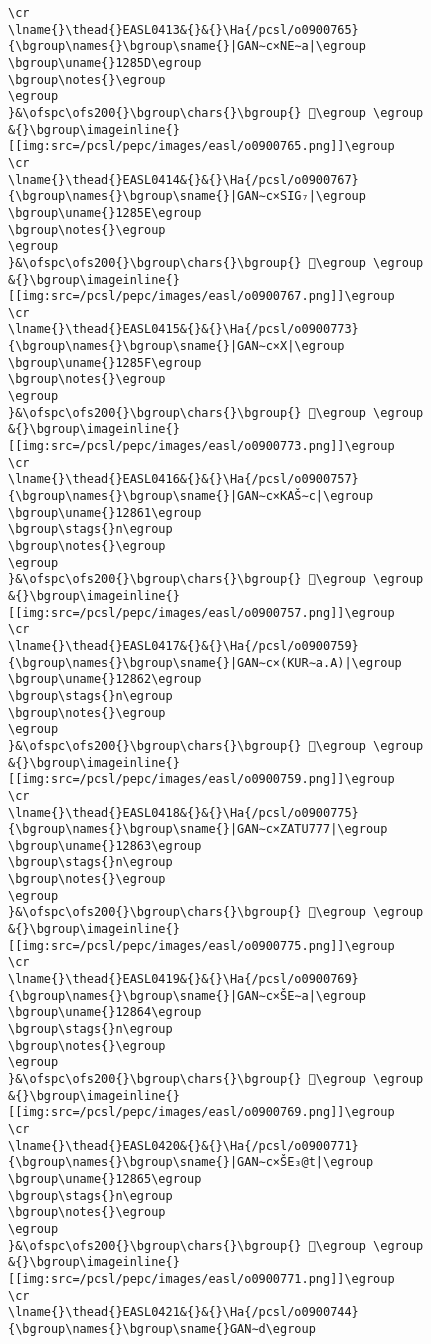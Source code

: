 \begin{verbatim}
\cr
\lname{}\thead{}EASL0413&{}&{}\Ha{/pcsl/o0900765}{\bgroup\names{}\bgroup\sname{}|GAN∼c×NE∼a|\egroup
\bgroup\uname{}1285D\egroup
\bgroup\notes{}\egroup
\egroup
}&\ofspc\ofs200{}\bgroup\chars{}\bgroup{} 𒡝\egroup \egroup
&{}\bgroup\imageinline{}[[img:src=/pcsl/pepc/images/easl/o0900765.png]]\egroup
\cr
\lname{}\thead{}EASL0414&{}&{}\Ha{/pcsl/o0900767}{\bgroup\names{}\bgroup\sname{}|GAN∼c×SIG₇|\egroup
\bgroup\uname{}1285E\egroup
\bgroup\notes{}\egroup
\egroup
}&\ofspc\ofs200{}\bgroup\chars{}\bgroup{} 𒡞\egroup \egroup
&{}\bgroup\imageinline{}[[img:src=/pcsl/pepc/images/easl/o0900767.png]]\egroup
\cr
\lname{}\thead{}EASL0415&{}&{}\Ha{/pcsl/o0900773}{\bgroup\names{}\bgroup\sname{}|GAN∼c×X|\egroup
\bgroup\uname{}1285F\egroup
\bgroup\notes{}\egroup
\egroup
}&\ofspc\ofs200{}\bgroup\chars{}\bgroup{} 𒡟\egroup \egroup
&{}\bgroup\imageinline{}[[img:src=/pcsl/pepc/images/easl/o0900773.png]]\egroup
\cr
\lname{}\thead{}EASL0416&{}&{}\Ha{/pcsl/o0900757}{\bgroup\names{}\bgroup\sname{}|GAN∼c×KAŠ∼c|\egroup
\bgroup\uname{}12861\egroup
\bgroup\stags{}n\egroup
\bgroup\notes{}\egroup
\egroup
}&\ofspc\ofs200{}\bgroup\chars{}\bgroup{} 𒡡\egroup \egroup
&{}\bgroup\imageinline{}[[img:src=/pcsl/pepc/images/easl/o0900757.png]]\egroup
\cr
\lname{}\thead{}EASL0417&{}&{}\Ha{/pcsl/o0900759}{\bgroup\names{}\bgroup\sname{}|GAN∼c×(KUR∼a.A)|\egroup
\bgroup\uname{}12862\egroup
\bgroup\stags{}n\egroup
\bgroup\notes{}\egroup
\egroup
}&\ofspc\ofs200{}\bgroup\chars{}\bgroup{} 𒡢\egroup \egroup
&{}\bgroup\imageinline{}[[img:src=/pcsl/pepc/images/easl/o0900759.png]]\egroup
\cr
\lname{}\thead{}EASL0418&{}&{}\Ha{/pcsl/o0900775}{\bgroup\names{}\bgroup\sname{}|GAN∼c×ZATU777|\egroup
\bgroup\uname{}12863\egroup
\bgroup\stags{}n\egroup
\bgroup\notes{}\egroup
\egroup
}&\ofspc\ofs200{}\bgroup\chars{}\bgroup{} 𒡣\egroup \egroup
&{}\bgroup\imageinline{}[[img:src=/pcsl/pepc/images/easl/o0900775.png]]\egroup
\cr
\lname{}\thead{}EASL0419&{}&{}\Ha{/pcsl/o0900769}{\bgroup\names{}\bgroup\sname{}|GAN∼c×ŠE∼a|\egroup
\bgroup\uname{}12864\egroup
\bgroup\stags{}n\egroup
\bgroup\notes{}\egroup
\egroup
}&\ofspc\ofs200{}\bgroup\chars{}\bgroup{} 𒡤\egroup \egroup
&{}\bgroup\imageinline{}[[img:src=/pcsl/pepc/images/easl/o0900769.png]]\egroup
\cr
\lname{}\thead{}EASL0420&{}&{}\Ha{/pcsl/o0900771}{\bgroup\names{}\bgroup\sname{}|GAN∼c×ŠE₃@t|\egroup
\bgroup\uname{}12865\egroup
\bgroup\stags{}n\egroup
\bgroup\notes{}\egroup
\egroup
}&\ofspc\ofs200{}\bgroup\chars{}\bgroup{} 𒡥\egroup \egroup
&{}\bgroup\imageinline{}[[img:src=/pcsl/pepc/images/easl/o0900771.png]]\egroup
\cr
\lname{}\thead{}EASL0421&{}&{}\Ha{/pcsl/o0900744}{\bgroup\names{}\bgroup\sname{}GAN∼d\egroup

\end{verbatim}
